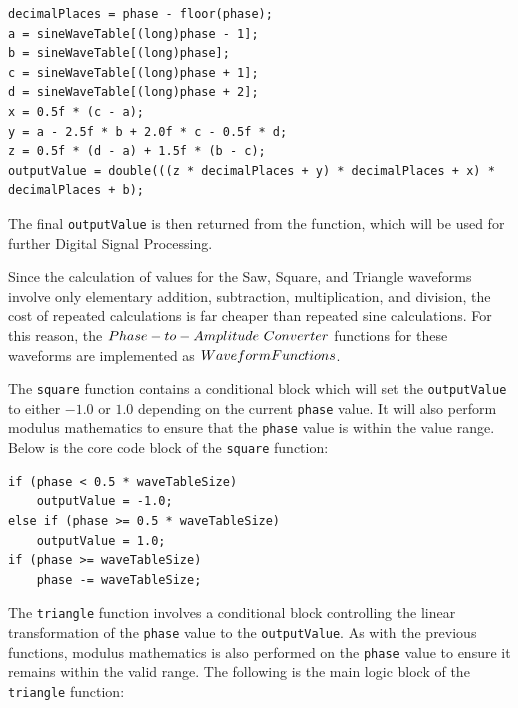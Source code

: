 \documentclass[a4paper,12pt]{report}
\begin{document}
 \noindent\begin{minipage}{\linewidth} \begin{lstlisting}[caption={4-Point Polynomial Interpolation implementation},label={code:4ptpolyinterpolation},captionpos=b]
decimalPlaces = phase - floor(phase);
a = sineWaveTable[(long)phase - 1];
b = sineWaveTable[(long)phase];
c = sineWaveTable[(long)phase + 1];
d = sineWaveTable[(long)phase + 2];
x = 0.5f * (c - a);
y = a - 2.5f * b + 2.0f * c - 0.5f * d;
z = 0.5f * (d - a) + 1.5f * (b - c);
outputValue = double(((z * decimalPlaces + y) * decimalPlaces + x) * decimalPlaces + b);
\end{lstlisting} \end{minipage}

The final \texttt{output\-Value} is then returned from the function, which will be used for further Digital Signal Processing.

Since the calculation of values for the Saw, Square, and Triangle waveforms involve only elementary addition, subtraction, multiplication, and division, the cost of repeated calculations is far cheaper than repeated sine calculations. For this reason, the $Phase-to-Amplitude\ \-Converter$ functions for these waveforms are implemented as $Waveform \-Functions$.

The \texttt{square} function contains a conditional block which will set the \texttt{output\-Value} to either $-1.0$ or $1.0$ depending on the current \texttt{phase} value. It will also perform modulus mathematics to ensure that the \texttt{phase} value is within the value range. Below is the core code block of the \texttt{square} function:

 \noindent\begin{minipage}{\linewidth} \begin{lstlisting}[caption={square()},label={code:square},captionpos=b]
if (phase < 0.5 * waveTableSize)
    outputValue = -1.0;
else if (phase >= 0.5 * waveTableSize)
    outputValue = 1.0;
if (phase >= waveTableSize)
    phase -= waveTableSize;
\end{lstlisting} \end{minipage}

The \texttt{triangle} function involves a conditional block controlling the linear transformation of the \texttt{phase} value to the \texttt{output\-Value}.  As with the previous functions, modulus mathematics is also performed on the \texttt{phase} value to ensure it remains within the valid range. The following is the main logic block of the \texttt{triangle} function:
\end{document}
